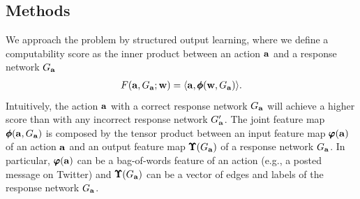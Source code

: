 {%
\subsection{Methods}
We approach the problem by structured output learning, where we define a computability score as the inner product between an action $\mathbf {a}$ and a response network $G_{\mathbf {a}}$
\begin{align*}
	F(\mathbf {a},G_{\mathbf {a}};\mathbf {w}) = \langle \mathbf {a}, \pmb \phi(\mathbf {w},G_{\mathbf {a}}) \rangle.
\end{align*}
Intuitively, the action $\mathbf {a}$ with a correct response network $G_{\mathbf {a}}$ will achieve a higher score than with any incorrect response network $G_{\mathbf {a}}'$.
The joint feature map $\pmb \phi(\mathbf {a},G_{\mathbf {a}})$ is composed by the tensor product between an input feature map $\pmb \varphi(\mathbf {a})$ of an action $\mathbf {a}$  and an output feature map $\pmb \Upsilon(G_{\mathbf {a}})$ of a response network $G_{\mathbf {a}}$.
In particular, $\pmb \varphi(\mathbf {a})$ can be a bag-of-words feature of an action (e.g., a posted message on Twitter) and $\pmb \Upsilon(G_{\mathbf {a}})$ can be a vector of edges and labels of the response network $G_{\mathbf {a}}$.

}
